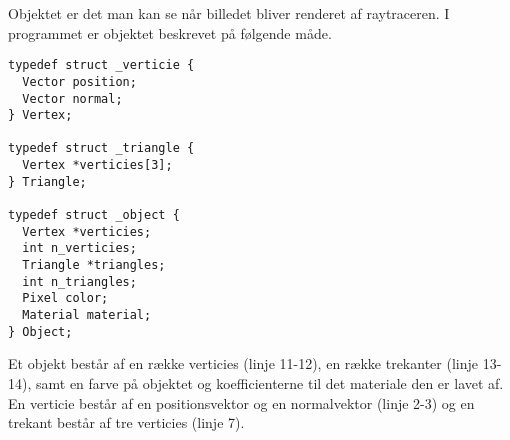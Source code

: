 Objektet er det man kan se når billedet bliver renderet af raytraceren. I programmet er objektet beskrevet på følgende måde.

\begin{lstlisting}[style=Cstyle, caption=Structs til objektet]
typedef struct _verticie {
  Vector position;
  Vector normal;
} Vertex;

typedef struct _triangle {
  Vertex *verticies[3];
} Triangle;

typedef struct _object {
  Vertex *verticies;
  int n_verticies;
  Triangle *triangles;
  int n_triangles;
  Pixel color;
  Material material;
} Object;
\end{lstlisting}

Et objekt består af en række verticies (linje 11-12), en række trekanter (linje 13-14), samt en farve på objektet og koefficienterne til det materiale den er lavet af. En verticie består af en positionsvektor og en normalvektor (linje 2-3) og en trekant består af tre verticies (linje 7).